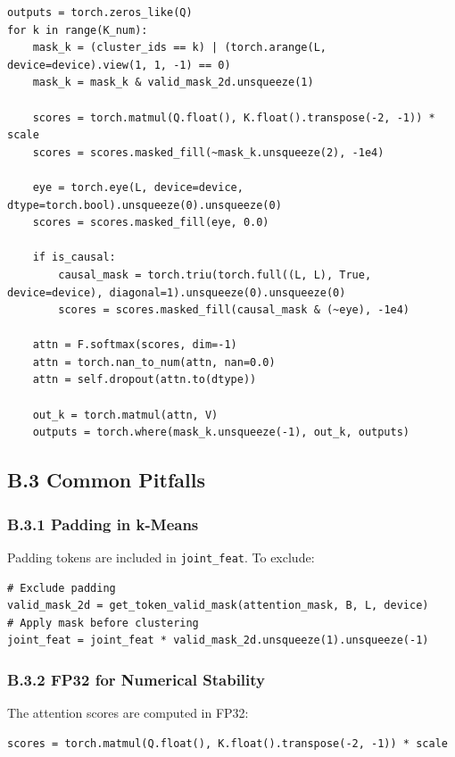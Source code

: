 \begin{lstlisting}
outputs = torch.zeros_like(Q)
for k in range(K_num):
    mask_k = (cluster_ids == k) | (torch.arange(L, device=device).view(1, 1, -1) == 0)
    mask_k = mask_k & valid_mask_2d.unsqueeze(1)

    scores = torch.matmul(Q.float(), K.float().transpose(-2, -1)) * scale
    scores = scores.masked_fill(~mask_k.unsqueeze(2), -1e4)

    eye = torch.eye(L, device=device, dtype=torch.bool).unsqueeze(0).unsqueeze(0)
    scores = scores.masked_fill(eye, 0.0)

    if is_causal:
        causal_mask = torch.triu(torch.full((L, L), True, device=device), diagonal=1).unsqueeze(0).unsqueeze(0)
        scores = scores.masked_fill(causal_mask & (~eye), -1e4)

    attn = F.softmax(scores, dim=-1)
    attn = torch.nan_to_num(attn, nan=0.0)
    attn = self.dropout(attn.to(dtype))

    out_k = torch.matmul(attn, V)
    outputs = torch.where(mask_k.unsqueeze(-1), out_k, outputs)
\end{lstlisting}

\subsection{B.3 Common Pitfalls}

\subsubsection{B.3.1 Padding in k-Means}

Padding tokens are included in \texttt{joint\_feat}. To exclude:

\begin{lstlisting}
# Exclude padding
valid_mask_2d = get_token_valid_mask(attention_mask, B, L, device)
# Apply mask before clustering
joint_feat = joint_feat * valid_mask_2d.unsqueeze(1).unsqueeze(-1)
\end{lstlisting}

\subsubsection{B.3.2 FP32 for Numerical Stability}

The attention scores are computed in FP32:

\begin{lstlisting}
scores = torch.matmul(Q.float(), K.float().transpose(-2, -1)) * scale
\end{lstlisting}

